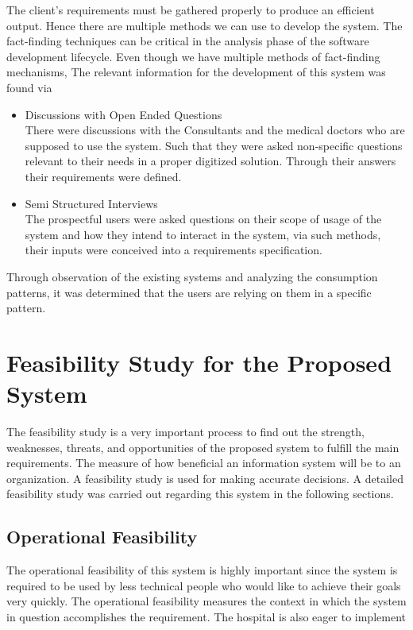 \documentclass[12pt,a4paper]{report}
\begin{document}
The client’s requirements must be gathered properly to produce an efficient output. Hence there are multiple methods we can use to develop the system. The fact-finding techniques can be critical in the analysis phase of the software development lifecycle. Even though we have multiple methods of fact-finding mechanisms, The relevant information for the development of this system was found via 
\begin{itemize}
	\item Discussions with Open Ended Questions \\
	There were discussions with the Consultants and the medical doctors who are supposed to use the system. Such that they were asked non-specific questions relevant to their needs in a proper digitized solution. Through their answers their requirements were defined.
	\item Semi Structured Interviews \\
	The prospectful users were asked questions on their scope of usage of the system and how they intend to interact in the system, via such methods, their inputs were conceived into a requirements specification. 
\end{itemize}
Through observation of the existing systems and analyzing the consumption patterns, it was determined that the users are relying on them in a specific pattern.  

\section{Feasibility Study for the Proposed System}

The feasibility study is a very important process to find out the strength, weaknesses, threats, and opportunities of the proposed system to fulfill the main requirements. The measure of how beneficial an information system will be to an organization. A feasibility study is used for making accurate decisions. A detailed feasibility study was carried out regarding this system in the following sections.

\subsection{Operational Feasibility}
The operational feasibility of this system is highly important since the system is required to be used by less technical people who would like to achieve their goals very quickly. The operational feasibility measures the context in which the system in question accomplishes the requirement. The hospital is also eager to implement 
\end{document}
